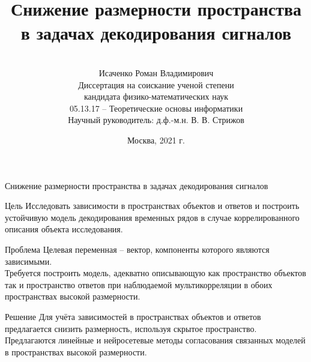 \documentclass[10pt]{beamer}
\title[\hbox to 56mm{  \hfill\insertframenumber\,/\,\inserttotalframenumber}]
{\\ \vspace{1.5cm} Снижение размерности пространства \\ в задачах декодирования сигналов}
\author[Роман Исаченко]{\\ 
	Исаченко Роман Владимирович \\
	\vspace{3mm}
	{\footnotesize 
	Диссертация на соискание ученой степени \\
	кандидата физико-математических наук
	} \\
	\vspace{0.2cm}
	{\footnotesize05.13.17 -- Теоретические основы информатики} \\
	\vspace{0.2cm}
	{\footnotesize Научный руководитель: д.ф.-м.н. В. В. Стрижов}
	}
\date{Москва, 2021 г.}
\begin{document}
\begin{frame}
\titlepage
\end{frame}
\begin{frame}{Снижение размерности пространства в задачах декодирования сигналов}
	\begin{block}{Цель}
		Исследовать зависимости в пространствах объектов и ответов и построить устойчивую модель декодирования временных рядов в случае коррелированного описания объекта исследования.
	\end{block}
	\begin{block}{Проблема}
		Целевая переменная -- вектор, компоненты которого являются зависимыми. \\
		Требуется построить модель, адекватно описывающую как пространство объектов так и пространство ответов при наблюдаемой мультикорреляции в обоих пространствах высокой размерности. 
	\end{block}
	\begin{block}{Решение}
		Для учёта зависимостей в пространствах объектов и ответов предлагается снизить размерность, используя скрытое пространство. Предлагаются линейные и нейросетевые методы согласования связанных моделей в пространствах высокой размерности.
	\end{block}
\end{frame}
\end{document}
